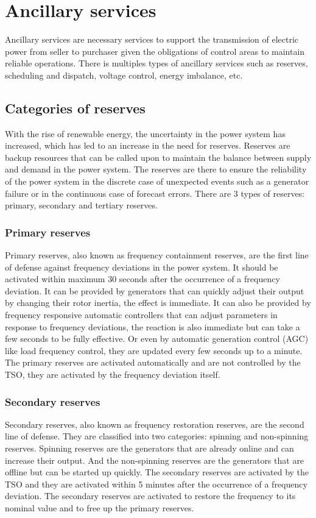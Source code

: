 \documentclass[12pt, openany]{report}
\theoremstyle{definition}
\begin{document}
\chapter{Ancillary services}
Ancillary services are necessary services to support the transmission of electric power from seller to purchaser given the obligations of control areas to maintain reliable operations. There is multiples types of ancillary services such as reserves, scheduling and dispatch, voltage control, energy imbalance, etc. 
\section{Categories of reserves}
With the rise of renewable energy, the uncertainty in the power system has increased, which has led to an increase in the need for reserves. Reserves are backup resources that can be called upon to maintain the balance between supply and demand in the power system. The reserves are there to ensure the reliability of the power system in the discrete case of unexpected events such as a generator failure or in the continuous case of forecast errors. There are 3 types of reserves: primary, secondary and tertiary reserves.
\subsection{Primary reserves}
Primary reserves, also known as frequency containment reserves, are the first line of defense against frequency deviations in the power system. It should be activated within maximum 30 seconds after the occurrence of a frequency deviation. It can be provided by generators that can quickly adjust their output by changing their rotor inertia, the effect is immediate. It can also be provided by frequency responsive automatic controllers that can adjust parameters in response to frequency deviations, the reaction is also immediate but can take a few seconds to be fully effective. Or even by automatic generation control (AGC) like load frequency control, they are updated every few seconds up to a minute. The primary reserves are activated automatically and are not controlled by the TSO, they are activated by the frequency deviation itself.
\subsection{Secondary reserves}
Secondary reserves, also known as frequency restoration reserves, are the second line of defense. They are classified into two categories: spinning and non-spinning reserves. Spinning reserves are the generators that are already online and can increase their output. And the non-spinning reserves are the generators that are offline but can be started up quickly. The secondary reserves are activated by the TSO and they are activated within 5 minutes after the occurrence of a frequency deviation. The secondary reserves are activated to restore the frequency to its nominal value and to free up the primary reserves.
\end{document}

